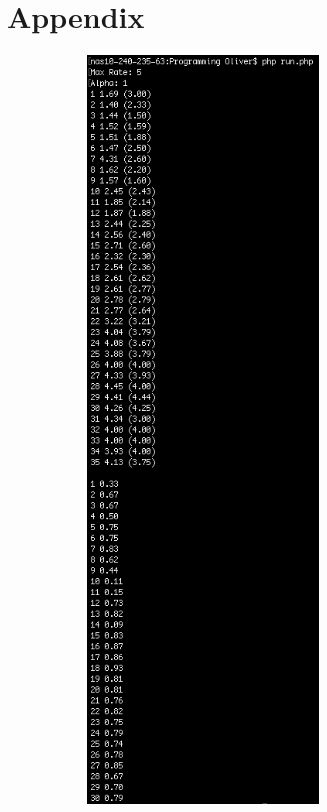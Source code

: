\documentclass{article}
\begin{document}
\section{Appendix}
\begin{figure}[ht]
\centering
\begin{subfigure}{0.5\textwidth}
\centering
\includegraphics[width=0.675\textwidth]{Screenshots/Alpha1}

\end{subfigure}
\end{figure}
\end{document}
